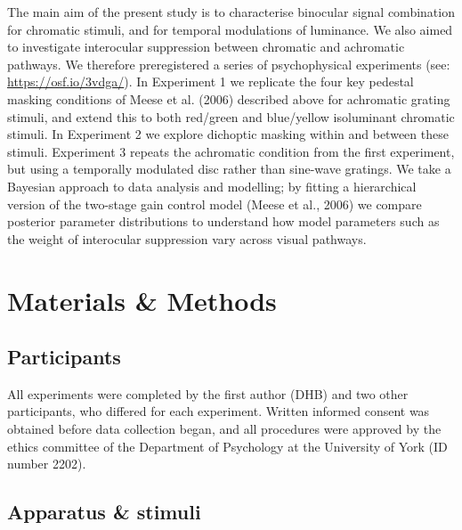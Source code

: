 \documentclass[
]{article}
\begin{document}
The main aim of the present study is to characterise binocular signal combination for chromatic stimuli, and for temporal modulations of luminance. We also aimed to investigate interocular suppression between chromatic and achromatic pathways. We therefore preregistered a series of psychophysical experiments (see: \url{https://osf.io/3vdga/}). In Experiment 1 we replicate the four key pedestal masking conditions of Meese et al. (2006) described above for achromatic grating stimuli, and extend this to both red/green and blue/yellow isoluminant chromatic stimuli. In Experiment 2 we explore dichoptic masking within and between these stimuli. Experiment 3 repeats the achromatic condition from the first experiment, but using a temporally modulated disc rather than sine-wave gratings. We take a Bayesian approach to data analysis and modelling; by fitting a hierarchical version of the two-stage gain control model (Meese et al., 2006) we compare posterior parameter distributions to understand how model parameters such as the weight of interocular suppression vary across visual pathways.

\hypertarget{materials-methods}{%
\section{Materials \& Methods}\label{materials-methods}}

\hypertarget{participants}{%
\subsection{Participants}\label{participants}}

All experiments were completed by the first author (DHB) and two other participants, who differed for each experiment. Written informed consent was obtained before data collection began, and all procedures were approved by the ethics committee of the Department of Psychology at the University of York (ID number 2202).

\hypertarget{apparatus-stimuli}{%
\subsection{Apparatus \& stimuli}\label{apparatus-stimuli}}
\end{document}
